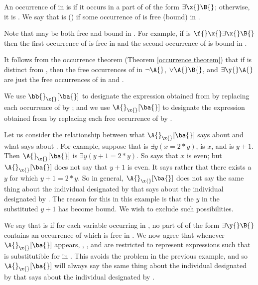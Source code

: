 An occurrence of \x{} in \A{} is  \A{} if it occurs in a part of \A{} of the form $\exists \x{} \B{}$;
otherwise, it is  \A{}.
We say that \x{} is  ()  \A{} if some occurrence of \x{} is free (bound) in \A{}.

\begin{remark}
    Note that \x{} may be both free and bound in \A{}.
    For example, if \A{} is $\f{} \x{} \exists \x{} \B{}$ then the first occurrence of \x{} is free in \A{} and the second occurrence of \x{} is bound in \A{}.
\end{remark}

It follows from the occurrence theorem (Theorem \eqref{occurrence theorem}) that if \y{} is distinct from \x{}, then the free occurrences of \x{} in $\neg \A{}$, $\vee \A{} \B{}$, and $\exists \y{} \A{}$ are just the free occurrences of \x{} in \A{} and \B{}.

We use $\bb{}_\x{} [\ba{}]$ to designate the expression obtained from \bb{} by replacing each occurrence of \x{} by \ba{};
and we use $\A{}_\x{} [\ba{}]$ to designate the expression obtained from \A{} by replacing each free occurrence of \x{} by \ba{}.

Let us consider the relationship between what $\A{}_\x{} [\ba{}]$ says about \ba{} and what \A{} says about \x{}.
For example, suppose that \A{} is $\exists y (x = 2 * y)$, \x{} is $x$, and \ba{} is $y + 1$.
Then $\A{}_\x{} [\ba{}]$ is $\exists y (y + 1 = 2 * y)$.
So \A{} says that $x$ is even;
but $\A{}_\x{} [\ba{}]$ does not say that $y + 1$ is even.
It says rather that there exists a $y$ for which $y + 1 = 2 * y$.
So in general, $\A{}_\x{} [\ba{}]$ does not say the same thing about the individual designated by \ba{} that \A{} says about the individual designated by \x{}.
The reason for this in this example is that the $y$ in the substituted $y + 1$ has become bound.
We wish to exclude such possibilities.

We say that \ba{} is  \x{}  \A{} if for each variable \y{} occurring in \ba{}, no part of \A{} of the form $\exists \y{} \B{}$ contains an occurrence of \x{} which is free in \A{}.
We now agree that whenever $\A{}_\x{} [\ba{}]$ appears, \A{}, \x{}, and \ba{} are restricted to represent expressions such that \ba{} is substitutible for \ba{} in \A{}.
This avoids the problem in the previous example, and so $\A{}_\x{} [\ba{}]$ will always say the same thing about the individual designated by \ba{} that \A{} says about the individual designated by \x{}.

